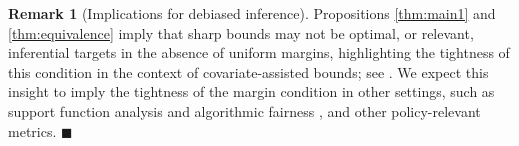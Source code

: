 \documentclass[12pt]{article}
\numberwithin{equation}{section}
\theoremstyle{plain}                         %
\theoremstyle{definition}                  %
\newtheorem{remark}{Remark}
\theoremstyle{remark}                      %
\renewcommand{\qed}{\hfill$\blacksquare$}
\begin{document}
\begin{remark}[Implications for debiased inference]
\label{rm:margin}
 Propositions \ref{thm:main1} and \ref{thm:equivalence} imply that sharp bounds may not be optimal, or relevant, inferential targets in the absence of uniform margins, highlighting the tightness of this condition in the context of covariate-assisted bounds; see \citet{kallus2020assessing, kallus2022whats,kallus2022treatment, levis2023covariateassisted, SemSupp2, Semenova2024}. We expect this insight to imply the tightness of the margin condition in other settings, such as support function analysis \cite{CCMS} and algorithmic fairness \cite{liu2025}, and other policy-relevant metrics. \qed
\end{remark}







\end{document}
